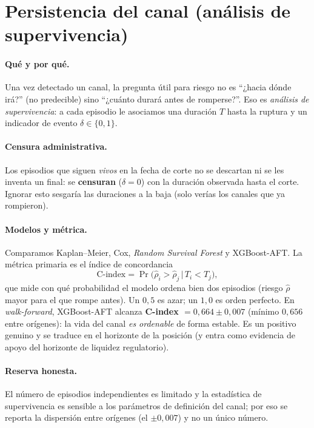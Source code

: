 \documentclass[11pt,a4paper]{article}
\begin{document}
\section{Persistencia del canal (análisis de supervivencia)}
\paragraph{Qué y por qué.} Una vez detectado un canal, la pregunta útil para
riesgo no es ``¿hacia dónde irá?'' (no predecible) sino ``¿cuánto durará antes de
romperse?''. Eso es \emph{análisis de supervivencia}: a cada episodio le asociamos
una duración $T$ hasta la ruptura y un indicador de evento $\delta\in\{0,1\}$.

\paragraph{Censura administrativa.} Los episodios que siguen \emph{vivos} en la
fecha de corte no se descartan ni se les inventa un final: se \textbf{censuran}
($\delta=0$) con la duración observada hasta el corte. Ignorar esto sesgaría las
duraciones a la baja (solo verías los canales que ya rompieron).

\paragraph{Modelos y métrica.} Comparamos Kaplan--Meier, Cox, \emph{Random
Survival Forest} y XGBoost-AFT. La métrica primaria es el índice de concordancia
\begin{equation}
\text{C-index}=\Pr\!\big(\hat{\rho}_i>\hat{\rho}_j \,\big|\, T_i<T_j\big),
\end{equation}
que mide con qué probabilidad el modelo ordena bien dos episodios (riesgo
$\hat\rho$ mayor para el que rompe antes). Un $0{,}5$ es azar; un $1{,}0$ es orden
perfecto. En \emph{walk-forward}, XGBoost-AFT alcanza \textbf{C-index
$=0{,}664\pm0{,}007$} (mínimo $0{,}656$ entre orígenes): la vida del canal
\emph{es ordenable} de forma estable. Es un positivo genuino y se traduce en el
horizonte de la posición (y entra como evidencia de apoyo del horizonte de
liquidez regulatorio).

\paragraph{Reserva honesta.} El número de episodios independientes es limitado y
la estadística de supervivencia es sensible a los parámetros de definición del
canal; por eso se reporta la dispersión entre orígenes (el $\pm0{,}007$) y no un
único número.
\end{document}
